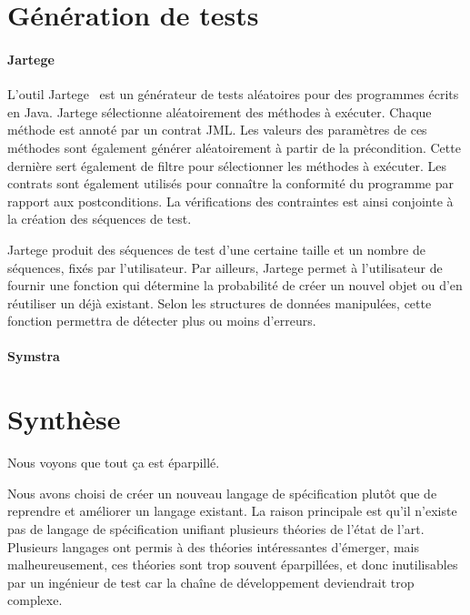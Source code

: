 \section{Génération de tests}

\paragraph{Jartege} L'outil Jartege~ est un générateur de tests
aléatoires pour des programmes écrits en Java. Jartege sélectionne aléatoirement
des méthodes à exécuter. Chaque méthode est annoté par un contrat JML. Les
valeurs des paramètres de ces méthodes sont également générer aléatoirement à
partir de la précondition. Cette dernière sert également de filtre pour
sélectionner les méthodes à exécuter. Les contrats sont également utilisés pour
connaître la conformité du programme par rapport aux postconditions. La
vérifications des contraintes est ainsi conjointe à la création des séquences de
test.

Jartege produit des séquences de test d'une certaine taille et un nombre de
séquences, fixés par l'utilisateur. Par ailleurs, Jartege permet à l'utilisateur
de fournir une fonction qui détermine la probabilité de créer un nouvel objet ou
d'en réutiliser un déjà existant. Selon les structures de données manipulées,
cette fonction permettra de détecter plus ou moins d'erreurs.

\paragraph{Symstra}

\section{Synthèse}

Nous voyons que tout ça est éparpillé.

Nous avons choisi de créer un nouveau langage de spécification plutôt que de
reprendre et améliorer un langage existant.
La raison principale est qu'il n'existe pas de langage de spécification unifiant
plusieurs théories de l'état de l'art. Plusieurs langages ont permis à des
théories intéressantes d'émerger, mais malheureusement, ces théories sont
trop souvent éparpillées, et donc inutilisables par un ingénieur de test car la
chaîne de développement deviendrait trop complexe.


